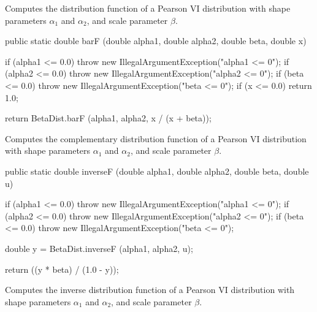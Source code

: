 \begin{tabb}
   Computes the distribution function of a Pearson VI distribution with
shape parameters $\alpha_1$
   and $\alpha_2$, and scale parameter $\beta$.
\end{tabb}
\begin{code}

   public static double barF (double alpha1, double alpha2,
                              double beta, double x)\begin{hide} {
      if (alpha1 <= 0.0)
         throw new IllegalArgumentException("alpha1 <= 0");
      if (alpha2 <= 0.0)
         throw new IllegalArgumentException("alpha2 <= 0");
      if (beta <= 0.0)
         throw new IllegalArgumentException("beta <= 0");
      if (x <= 0.0)
         return 1.0;

      return BetaDist.barF (alpha1, alpha2, x / (x + beta));
   }\end{hide}
\end{code}
\begin{tabb}
   Computes the complementary distribution function of a Pearson VI distribution
   with shape parameters $\alpha_1$ and $\alpha_2$, and scale parameter $\beta$.
\end{tabb}
\begin{code}

   public static double inverseF (double alpha1, double alpha2,
                                  double beta, double u)\begin{hide} {
      if (alpha1 <= 0.0)
         throw new IllegalArgumentException("alpha1 <= 0");
      if (alpha2 <= 0.0)
         throw new IllegalArgumentException("alpha2 <= 0");
      if (beta <= 0.0)
         throw new IllegalArgumentException("beta <= 0");

      double y = BetaDist.inverseF (alpha1, alpha2, u);

      return ((y * beta) / (1.0 - y));
   }\end{hide}
\end{code}
\begin{tabb}
   Computes the inverse distribution function of a Pearson VI distribution
   with shape parameters $\alpha_1$ and $\alpha_2$, and scale parameter $\beta$.
\end{tabb}
